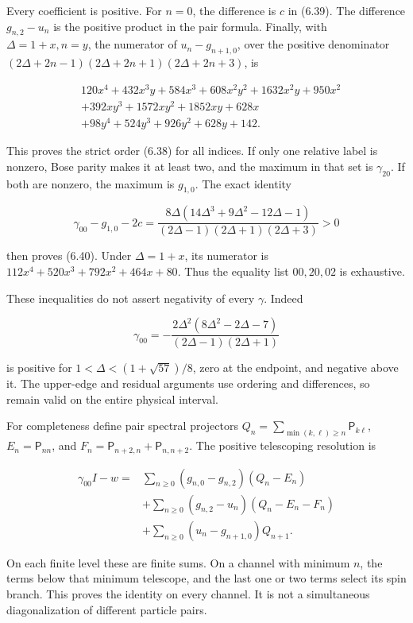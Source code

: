 \documentclass[a4paper,11pt]{article}
\numberwithin{equation}{section}
\begin{document}
Every coefficient is positive. For \(n=0\), the difference is \(c\) in (6.39). The difference \(g_{n,2}-u_n\) is the positive product in the pair formula. Finally, with \(\Delta=1+x,n=y\), the numerator of \(u_n-g_{n+1,0}\), over the positive denominator \((2\Delta+2n-1)(2\Delta+2n+1)(2\Delta+2n+3)\), is

\[
\begin{aligned}
&120x^4+432x^3y+584x^3+608x^2y^2+1632x^2y+950x^2\\
&+392xy^3+1572xy^2+1852xy+628x\\
&+98y^4+524y^3+926y^2+628y+142.
\end{aligned}
\tag{G.2}
\]

This proves the strict order (6.38) for all indices. If only one relative label is nonzero, Bose parity makes it at least two, and the maximum in that set is \(\gamma_{20}\). If both are nonzero, the maximum is \(g_{1,0}\). The exact identity

\[
\gamma_{00}-g_{1,0}-2c=
\frac{8\Delta(14\Delta^3+9\Delta^2-12\Delta-1)}
{(2\Delta-1)(2\Delta+1)(2\Delta+3)}>0
\tag{G.3}
\]

then proves (6.40). Under \(\Delta=1+x\), its numerator is \(112x^4+520x^3+792x^2+464x+80\). Thus the equality list \(00,20,02\) is exhaustive.

These inequalities do not assert negativity of every \(\gamma\). Indeed

\[
\gamma_{00}=-\frac{2\Delta^2(8\Delta^2-2\Delta-7)}{(2\Delta-1)(2\Delta+1)}
\]

is positive for \(1<\Delta<(1+\sqrt{57})/8\), zero at the endpoint, and negative above it. The upper-edge and residual arguments use ordering and differences, so remain valid on the entire physical interval.

For completeness define pair spectral projectors \(Q_n=\sum_{\min(k,\ell)\ge n}\mathsf P_{k\ell}\), \(E_n=\mathsf P_{nn}\), and \(F_n=\mathsf P_{n+2,n}+\mathsf P_{n,n+2}\). The positive telescoping resolution is

\[
\begin{aligned}
\gamma_{00}I-w={}&\sum_{n\ge0}(g_{n,0}-g_{n,2})(Q_n-E_n)\\
&+\sum_{n\ge0}(g_{n,2}-u_n)(Q_n-E_n-F_n)\\
&+\sum_{n\ge0}(u_n-g_{n+1,0})Q_{n+1}.
\end{aligned}
\tag{G.4}
\]

On each finite level these are finite sums. On a channel with minimum \(n\), the terms below that minimum telescope, and the last one or two terms select its spin branch. This proves the identity on every channel. It is not a simultaneous diagonalization of different particle pairs.
\end{document}
